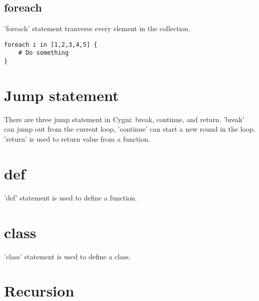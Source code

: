 \subsection{foreach}
'foreach' statement tranverse every element in the collection.
\begin{lstlisting}
foreach i in [1,2,3,4,5] {
	# Do something
}
\end{lstlisting}

\section{Jump statement}
There are three jump statement in Cygni: break, continue, and return. 'break' can jump out from the current loop, 'continue' can start a new round in the loop. 'return' is used to return value from a function.

\section{def}
'def' statement is used to define a function.

\section{class}
'class' statement is used to define a class.

\section{Recursion}

